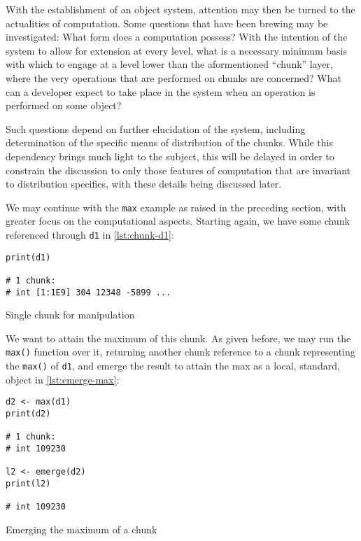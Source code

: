 With the establishment of an object system, attention may then be turned
to the actualities of computation. Some questions that have been brewing
may be investigated: What form does a computation possess? With the
intention of the system to allow for extension at every level, what is a
necessary minimum basis with which to engage at a level lower than the
aformentioned ``chunk'' layer, where the very operations that are
performed on chunks are concerned? What can a developer expect to take
place in the system when an operation is performed on some object?

Such questions depend on further elucidation of the system, including
determination of the specific means of distribution of the chunks. While
this dependency brings much light to the subject, this will be delayed
in order to constrain the discussion to only those features of
computation that are invariant to distribution specifics, with these
details being discussed later.

We may continue with the \texttt{max} example as raised in the preceding
section, with greater focus on the computational aspects. Starting
again, we have some chunk referenced through \texttt{d1} in \cref{lst:chunk-d1}:

\begin{listing}
    \begin{verbatim}
print(d1)

# 1 chunk:
# int [1:1E9] 304 12348 -5899 ...
    \end{verbatim}
    \caption{Single chunk for manipulation}
    \label{lst:chunk-d1}
\end{listing}

We want to attain the maximum of this chunk. As given before, we may run
the \texttt{max()} function over it, returning another chunk reference to
a chunk representing the \texttt{max()} of \texttt{d1}, and emerge the
result to attain the max as a local, standard, object in \cref{lst:emerge-max}:

\begin{listing}
    \begin{verbatim}
d2 <- max(d1)
print(d2)

# 1 chunk:
# int 109230

l2 <- emerge(d2)
print(l2)

# int 109230
    \end{verbatim}
    \caption{Emerging the maximum of a chunk}
    \label{lst:emerge-max}
\end{listing}

